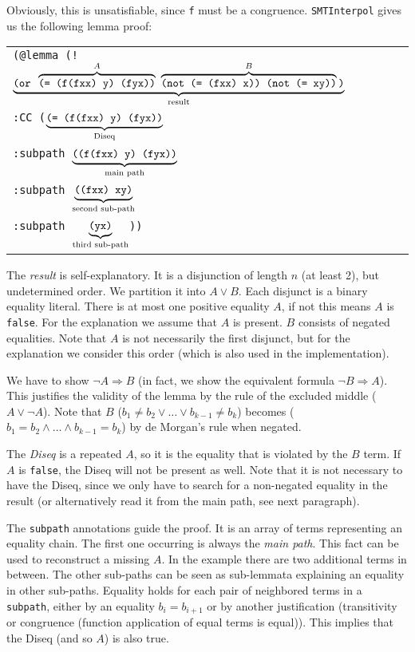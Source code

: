 \documentclass[10pt,a4paper]{article}
\newcommand{\si}{\texttt{SMTInterpol}\xspace}
\newcommand{\ttt}{\texttt}
\newcommand{\Ra}{\Rightarrow}
\newcommand{\false}{\ttt{false}\xspace}
\newcommand{\x}{\xX\xspace}
\newcommand{\y}{\yX\xspace}
\newcommand{\f}{\ttt{f}\xspace}
\newcommand{\xX}{\ttt{x}}
\newcommand{\yX}{\ttt{y}}
\def\ind{\quad}
\begin{document}
Obviously, this is unsatisfiable, since \f must be a congruence. \si gives us the following lemma proof:
%
\begin{center}
	\begin{tabular}{l}
		\ttt{(@lemma (! $\underbrace{\ttt{(or }\overbrace{\ttt{(= (\f (\f \x \x) \y) (\f \y \x))}}^{A} \ \overbrace{\ttt{(not (= (\f \x \x) \x)) (not (= \x \y))}}^{B}\ttt{)}}_{\text{result}}$} \\[3mm]
		\ttt{\ind :CC ($\underbrace{\ttt{(= (\f (\f \x \x) \y) (\f \y \x))}}_{\text{Diseq}}$} \\[5mm]
		\ttt{\ind \ind :subpath $\underbrace{\ttt{((\f (\f \x \x) \y) (\f \y \x))}}_{\text{main path}}$} \\[5mm]
		\ttt{\ind \ind :subpath $\underbrace{\ttt{((\f \x \x) \x \y)}}_{\text{second sub-path}}$} \\[5mm]
		\ttt{\ind \ind :subpath $\underbrace{\ttt{(\y \x)}}_{\text{third sub-path}}$))}
	\end{tabular}
\end{center}

The \emph{result} is self-explanatory. It is a disjunction of length $n$ (at least 2), but undetermined order. We partition it into $A \lor B$. Each disjunct is a binary equality literal. There is at most one positive equality $A$, if not this means $A$ is \false. For the explanation we assume that $A$ is present. $B$ consists of negated equalities. Note that $A$ is not necessarily the first disjunct, but for the explanation we consider this order (which is also used in the implementation).

We have to show $\neg A \Ra B$ (in fact, we show the equivalent formula $\neg B \Ra A$). This justifies the validity of the lemma by the rule of the excluded middle ($A \lor \neg A$). Note that $B$ ($b_1 \neq b_2 \lor \dots \lor b_{k-1} \neq b_k$) becomes ($b_1 = b_2 \land \dots \land b_{k-1} = b_k$) by de Morgan's rule when negated.

The \emph{Diseq} is a repeated $A$, so it is the equality that is violated by the $B$ term. If $A$ is \false, the Diseq will not be present as well. Note that it is not necessary to have the Diseq, since we only have to search for a non-negated equality in the result (or alternatively read it from the main path, see next paragraph).
	 
The \ttt{subpath} annotations guide the proof. It is an array of terms representing an equality chain. The first one occurring is always the \emph{main path}. This fact can be used to reconstruct a missing $A$. In the example there are two additional terms in between. The other sub-paths can be seen as sub-lemmata explaining an equality in other sub-paths. Equality holds for each pair of neighbored terms in a \ttt{subpath}, either by an equality $b_i = b_{i+1}$ or by another justification (transitivity or congruence (function application of equal terms is equal)). This implies that the Diseq (and so $A$) is also true.
\end{document}
